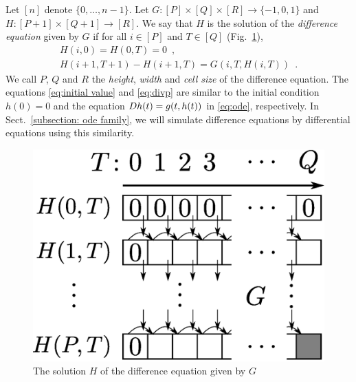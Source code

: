 Let $[n]$ denote $\{0, \dots , n-1\}$.
Let $G \colon [P] \times [Q] \times [R] \to \{-1, 0, 1\}$ and
$H \colon [P + 1] \times [Q+1] \to [R]$. 
We say that $H$ is the solution of the \emph{difference equation} given by $G$
if for all $i \in [P]$ and $T \in [Q]$ (Fig.~\ref{fig:divp}), 
\begin{gather}
   H(i, 0) = H(0, T) = 0 \enspace , \label{eq:initial value}
\\
   H(i + 1, T + 1) - H(i+1, T) = G(i, T, H(i, T)) \enspace .  \label{eq:divp}
\end{gather}
We call $P$, $Q$ and $R$ the \emph{height}, \emph{width} and \emph{cell size} of
the difference equation.
The equations \eqref{eq:initial value} and \eqref{eq:divp} are similar to 
the initial condition $h(0) = 0$ and the equation $D h(t) = g(t, h(t))$ 
in \eqref{eq:ode}, respectively.
In Sect.~\ref{subsection: ode family}, we will simulate difference equations by differential equations using this similarity.

\begin{figure}
 \begin{center}
  \includegraphics[height=0.15\textheight]{image/divp.eps}
 \end{center}
 \caption{The solution $H$ of the difference equation given by $G$}
 \label{fig:divp}
\end{figure}

